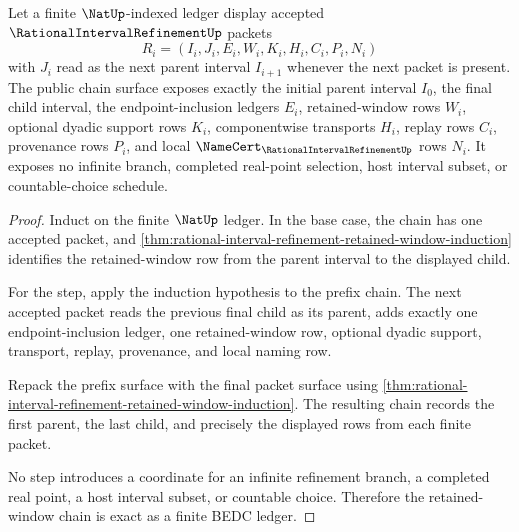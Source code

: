 \begin{theorem}
\label{thm:rational-interval-refinement-chain-exactness}
Let a finite $\NatUp$-indexed ledger display accepted $\RationalIntervalRefinementUp$ packets
$$
R_i=(I_i,J_i,E_i,W_i,K_i,H_i,C_i,P_i,N_i)
$$
with $J_i$ read as the next parent interval $I_{i+1}$ whenever the next packet is present. The public chain surface exposes exactly the initial parent interval $I_0$, the final child interval, the endpoint-inclusion ledgers $E_i$, retained-window rows $W_i$, optional dyadic support rows $K_i$, componentwise transports $H_i$, replay rows $C_i$, provenance rows $P_i$, and local $\NameCert_{\RationalIntervalRefinementUp}$ rows $N_i$. It exposes no infinite branch, completed real-point selection, host interval subset, or countable-choice schedule.
\end{theorem}
\begin{proof}
Induct on the finite $\NatUp$ ledger. In the base case, the chain has one accepted packet, and \autoref{thm:rational-interval-refinement-retained-window-induction} identifies the retained-window row from the parent interval to the displayed child.

For the step, apply the induction hypothesis to the prefix chain. The next accepted packet reads the previous final child as its parent, adds exactly one endpoint-inclusion ledger, one retained-window row, optional dyadic support, transport, replay, provenance, and local naming row.

Repack the prefix surface with the final packet surface using \autoref{thm:rational-interval-refinement-retained-window-induction}. The resulting chain records the first parent, the last child, and precisely the displayed rows from each finite packet.

No step introduces a coordinate for an infinite refinement branch, a completed real point, a host interval subset, or countable choice. Therefore the retained-window chain is exact as a finite BEDC ledger.
\end{proof}

